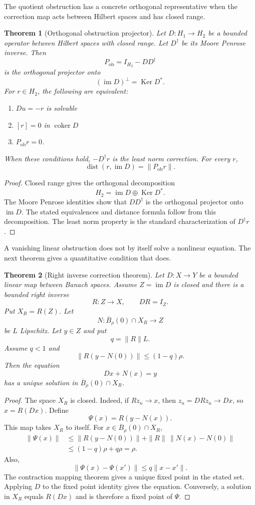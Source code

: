 \documentclass{aomart}
\newtheorem{theorem}{Theorem}[section]
\theoremstyle{definition}
\theoremstyle{remark}
\newcommand{\im}{\operatorname{im}}
\newcommand{\Ker}{\operatorname{Ker}}
\newcommand{\coker}{\operatorname{coker}}
\newcommand{\dist}{\operatorname{dist}}
\begin{document}
The quotient obstruction has a concrete orthogonal representative when the correction map acts between Hilbert spaces and has closed range.

\begin{theorem}[Orthogonal obstruction projector]\label{thm:orthogonal_obstruction}
Let $D:H_1\to H_2$ be a bounded operator between Hilbert spaces with closed range.  Let $D^\dagger$ be its Moore Penrose inverse.  Then
\[
P_{\mathrm{ob}}=I_{H_2}-DD^\dagger
\]
is the orthogonal projector onto
\[
(\im D)^\perp=\Ker D^*.
\]
For $r\in H_2$, the following are equivalent:
\begin{enumerate}
\item $Du=-r$ is solvable
\item $[r]=0$ in $\coker D$
\item $P_{\mathrm{ob}}r=0$.
\end{enumerate}
When these conditions hold, $-D^\dagger r$ is the least norm correction.  For every $r$,
\[
\dist(r,\im D)=\|P_{\mathrm{ob}}r\|.
\]
\end{theorem}

\begin{proof}
Closed range gives the orthogonal decomposition
\[
H_2=\im D\oplus\Ker D^*.
\]
The Moore Penrose identities show that $DD^\dagger$ is the orthogonal projector onto $\im D$.  The stated equivalences and distance formula follow from this decomposition.  The least norm property is the standard characterization of $D^\dagger r$.
\end{proof}

A vanishing linear obstruction does not by itself solve a nonlinear equation.  The next theorem gives a quantitative condition that does.

\begin{theorem}[Right inverse correction theorem]\label{thm:right_inverse_correction}
Let $D:X\to Y$ be a bounded linear map between Banach spaces.  Assume $Z=\im D$ is closed and there is a bounded right inverse
\[
R:Z\longrightarrow X,
\qquad
DR=I_Z.
\]
Put $X_R=R(Z)$.  Let
\[
N:\overline B_\rho(0)\cap X_R\longrightarrow Z
\]
be $L$ Lipschitz.  Let $y\in Z$ and put
\[
q=\|R\|L.
\]
Assume $q<1$ and
\[
\|R(y-N(0))\|
\le
(1-q)\rho.
\]
Then the equation
\[
Dx+N(x)=y
\]
has a unique solution in $\overline B_\rho(0)\cap X_R$.
\end{theorem}

\begin{proof}
The space $X_R$ is closed.  Indeed, if $Rz_n\to x$, then $z_n=DRz_n\to Dx$, so $x=R(Dx)$.  Define
\[
\Psi(x)=R(y-N(x)).
\]
This map takes $X_R$ to itself.  For $x\in\overline B_\rho(0)\cap X_R$,
\[
\begin{aligned}
\|\Psi(x)\|
&\le
\|R(y-N(0))\|
+
\|R\|\,\|N(x)-N(0)\|\\
&\le
(1-q)\rho+q\rho
=\rho.
\end{aligned}
\]
Also,
\[
\|\Psi(x)-\Psi(x')\|
\le q\|x-x'\|.
\]
The contraction mapping theorem gives a unique fixed point in the stated set.  Applying $D$ to the fixed point identity gives the equation.  Conversely, a solution in $X_R$ equals $R(Dx)$ and is therefore a fixed point of $\Psi$.
\end{proof}
\end{document}
